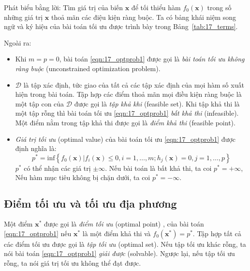 Phát biểu bằng lời: Tìm giá trị của biến $\mathbf{x}$ để tối thiểu hàm
$f_0(\mathbf{x})$ trong số những giá trị $\mathbf{x}$ thoả mãn các điệu kiện
ràng buộc. Ta có bảng khái niệm song ngữ và ký hiệu của bài toán tối ưu được trình bày  trong Bảng~\ref{tab:17_terms}.

Ngoài ra:
\begin{itemize}
\item Khi $m = p = 0$, bài toán \eqref{eqn:17_optprob1} được gọi là
\textit{bài toán tối ưu không ràng buộc} ({unconstrained optimization
problem}).

\item $\mathcal{D}$ là tập xác định, tức giao của tất cả các tập xác định
của mọi hàm số xuất hiện trong bài toán. Tập hợp các điểm thoả mãn mọi điều
kiện ràng buộc là một tập con của $\mathcal{D}$ được gọi là \textit{tập khả khi} (feasible set). Khi tập khả thi là một tập rỗng thì bài toán tối ưu \eqref{eqn:17_optprob1} \textit{bất khả thi} ({infeasible}). Một điểm nằm trong tập khả thi được gọi là \textit{điểm khả thi} (feasible point).

\item  \textit{Giá trị tối ưu} (optimal value) của bài toán tối ưu \eqref{eqn:17_optprob1} được định nghĩa là:
\begin{equation*}
p^* = \text{inf}\left\{f_0(\mathbf{x}) | f_i(\mathbf{x}) \leq 0, i = 1, \dots, m; h_j(\mathbf{x}) = 0, j = 1, \dots, p\right\}
\end{equation*}
$p^*$ có thể nhận các giá
trị $\pm \infty$. Nếu bài toán là bất khả thi, ta coi $p^* = + \infty$, Nếu hàm mục tiêu
không bị chặn dưới, ta coi
$p^* = - \infty$.

\end{itemize}


\subsection{Điểm tối ưu và tối ưu địa phương}

Một điểm $\mathbf{x}^*$ được gọi là \textit{điểm tối ưu} ({optimal point})
, của bài toán
\eqref{eqn:17_optprob1} nếu $\mathbf{x}^*$ là một điểm khả thi và
$f_0(\mathbf{x}^*) = p^*$. Tập hợp tất cả các điểm tối ưu được gọi là
\textit{tập tối ưu} ({optimal set}). Nếu tập tối ưu khác rỗng,
ta nói bài toán \eqref{eqn:17_optprob1} \textit{giải được}
({solvable}). Ngược lại, nếu tập tối ưu rỗng, ta nói giá trị tối ưu không thể đạt được.

